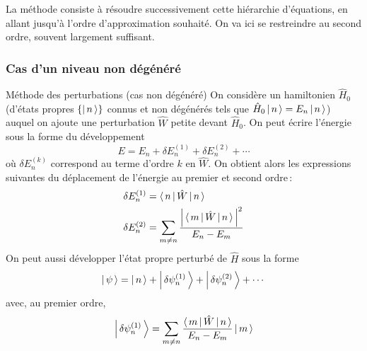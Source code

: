     La méthode consiste à résoudre successivement cette hiérarchie d’équations, en allant jusqu’à l’ordre d’approximation souhaité. On va ici se restreindre au second ordre, souvent largement suffisant.

        \subsubsection{Cas d’un niveau non dégénéré}

    \begin{omed}{Méthode des perturbations (cas non dégénéré)}
        On considère un hamiltonien $\hat{H}_0$ (d’états propres $\left\{\left| \, n \, \right>\right\}$ connus et non dégénérés tels que $\hat{H}_0 \left| \, n \, \right> = E_n \left| \, n \, \right>$) auquel on ajoute une perturbation $\hat{W}$ petite devant $\hat{H}_0$. On peut écrire l’énergie sous la forme du développement 
        \[ E = E_n + \delta E_n^{(1)} + \delta E_n^{(2)} + \cdots \]   
        où $\delta E_n^{(k)}$ correspond au terme d’ordre $k$ en $\hat{W}$. On obtient alors les expressions suivantes du déplacement de l’énergie au premier et second ordre :
        \begin{align*}
            \delta E_n^{(1)} &= \left< \, n \, \right| \hat{W} \left| \, n \, \right> \\
            \delta E_n^{(2)} &= \sum_{m \neq n} \frac{\left\lvert \, \left< \, m \, \right| \hat{W} \left| \, n \, \right> \, \right\rvert^2}{E_n - E_m}
        \end{align*}
        On peut aussi développer l’état propre perturbé de $\hat{H}$ sous la forme 
        \[ \left| \, \psi \, \right> = \left| \, n \, \right> + \left| \, \delta \psi_n^{(1)} \, \right> + \left| \, \delta \psi_n^{(2)} \, \right> + \cdots \]   
        avec, au premier ordre, 
        \[ \left| \, \delta \psi_n^{(1)} \, \right> = \sum_{m \neq n} \frac{\left< \, m \, \right| \hat{W} \left| \, n \, \right>}{E_n - E_m} \left| \, m \, \right> \]
    \end{omed}

